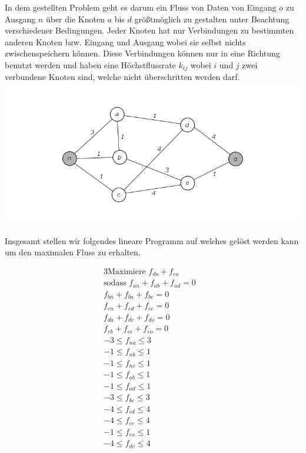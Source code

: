 	In dem gestellten Problem geht es darum ein Fluss von Daten von Eingang $o$ zu Ausgang $n$ über die Knoten $a$ bis $d$ größtmöglich zu gestalten unter Beachtung verschiedener Bedingungen.  Jeder Knoten hat nur Verbindungen zu bestimmten anderen Knoten bzw. Eingang und Ausgang wobei sie selbst nichts zwischenspeichern können. Diese Verbindungen können nur in eine Richtung benutzt werden und haben eine Höchstflussrate $k_{ij}$ wobei $i$ und $j$ zwei verbundene Knoten sind, welche nicht überschritten werden darf.
	\includegraphics*[width=\textwidth]{Grafiken/Netzwerkflussbild.png}
	
	Insgesamt stellen wir folgendes lineare Programm auf welches gelöst werden kann um den maximalen Fluss zu erhalten.
	
\begin{alignat*}{3}
	\text{Maximiere }  	  f_{do}+f_{eo}  & \\
	\text{sodass }  f_{an}+f_{ab}+f_{ad}=0&\\
				f_{bn}+f_{ba}+f_{be}=0\\
				f_{cn}+f_{cd}+f_{ce}=0&\\
				f_{da}+f_{dc}+f_{do}=0&\\
				f_{eb}+f_{ec}+f_{eo}=0&\\
					-3\leq f_{na} \leq 3&\\
					-1\leq f_{nb} \leq 1&\\
					-1\leq f_{nc} \leq 1&\\
					-1\leq f_{ab} \leq 1&\\
					-1\leq f_{ad} \leq 1&\\
					-3\leq f_{be} \leq 3&\\
					-4\leq f_{cd} \leq 4&\\
					-4\leq f_{ce} \leq 4&\\
					-1\leq f_{eo} \leq 1&\\
					-4\leq f_{de} \leq 4&
\end{alignat*}
	
